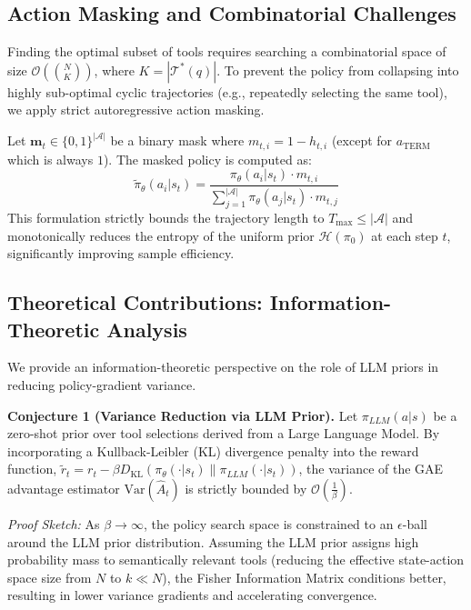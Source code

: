 \documentclass{article}
\begin{document}
\subsection{Action Masking and Combinatorial Challenges}
\label{sec:action_masking}
Finding the optimal subset of tools requires searching a combinatorial space of size $\mathcal{O}(\binom{N}{K})$, where $K = |\mathcal{T}^*(q)|$. To prevent the policy from collapsing into highly sub-optimal cyclic trajectories (e.g., repeatedly selecting the same tool), we apply strict autoregressive action masking. 

Let $\mathbf{m}_t \in \{0, 1\}^{|\mathcal{A}|}$ be a binary mask where $m_{t, i} = 1 - h_{t, i}$ (except for $a_{\text{TERM}}$ which is always $1$). The masked policy is computed as:
\begin{equation}
\tilde{\pi}_\theta(a_i | s_t) = \frac{\pi_\theta(a_i | s_t) \cdot m_{t, i}}{\sum_{j=1}^{|\mathcal{A}|} \pi_\theta(a_j | s_t) \cdot m_{t, j}}
\end{equation}
This formulation strictly bounds the trajectory length to $T_{\max} \le |\mathcal{A}|$ and monotonically reduces the entropy of the uniform prior $\mathcal{H}(\pi_0)$ at each step $t$, significantly improving sample efficiency.

\subsection{Theoretical Contributions: Information-Theoretic Analysis}
We provide an information-theoretic perspective on the role of LLM priors in reducing policy-gradient variance. 

\textbf{Conjecture 1 (Variance Reduction via LLM Prior).} Let $\pi_{LLM}(a|s)$ be a zero-shot prior over tool selections derived from a Large Language Model. By incorporating a Kullback-Leibler (KL) divergence penalty into the reward function, $\tilde{r}_t = r_t - \beta D_{\text{KL}}(\pi_\theta(\cdot|s_t) \parallel \pi_{LLM}(\cdot|s_t))$, the variance of the GAE advantage estimator $\text{Var}(\hat{A}_t)$ is strictly bounded by $\mathcal{O}(\frac{1}{\beta})$. 

\textit{Proof Sketch:} As $\beta \to \infty$, the policy search space is constrained to an $\epsilon$-ball around the LLM prior distribution. Assuming the LLM prior assigns high probability mass to semantically relevant tools (reducing the effective state-action space size from $N$ to $k \ll N$), the Fisher Information Matrix conditions better, resulting in lower variance gradients and accelerating convergence.
\end{document}
